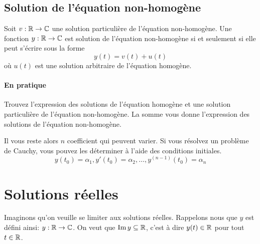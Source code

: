 \subsection{Solution de l'équation non-homogène}
\begin{mytheo}
	Soit $v: \mathbb{R} \to \mathbb{C}$ une solution particulière de l'équation non-homogène.
	Une fonction $y: \mathbb{R} \to \mathbb{C}$ est solution de l'équation non-homogène si et seulement si elle peut s'écrire sous la forme
	\[ y(t) = v(t) + u(t) \]
	où $u(t)$ est une solution arbitraire de l'équation homogène.
\end{mytheo}

\paragraph{En pratique}
Trouvez l'expression des solutions de l'équation homogène et une solution particulière de l'équation non-homogène.
La somme vous donne l'expression des solutions de l'équation non-homogène.

Il vous reste alors $n$ coefficient qui peuvent varier.
Si vous résolvez un problème de Cauchy, vous pouvez les déterminer à l'aide des conditions initiales.
\[ y(t_0) = \alpha_1, y'(t_0) = \alpha_2, \dots , y^{(n-1)}(t_0) = \alpha_n \]

\section{Solutions réelles}
Imaginons qu'on veuille se limiter aux solutions réelles.  Rappelons nous que $y$ est défini ainsi: $y: \mathbb{R} \to \mathbb{C}$.
On veut que $\operatorname{Im} y \subseteq \mathbb{R}$, c'est à dire $y(t) \in \mathbb{R}$ pour tout $t \in \mathbb{R}$.

